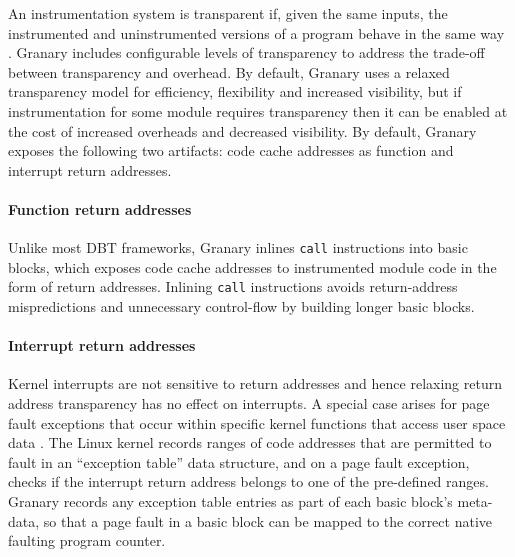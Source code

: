 \documentclass[preprint]{sigplanconf}
\begin{document}
An instrumentation system is transparent if, given the same inputs, the instrumented and uninstrumented versions of a program behave in the same way \cite{Transparency}. Granary includes configurable levels of transparency to address the trade-off between transparency and overhead. By default, Granary uses a relaxed transparency model for efficiency, flexibility and increased visibility, but if instrumentation for some module requires transparency then it can be enabled at the cost of increased overheads and decreased visibility. By default, Granary exposes the following two artifacts: code cache addresses as function and interrupt return addresses.

\paragraph{Function return addresses}\label{para:return_address_transparency} Unlike most DBT frameworks, Granary inlines \texttt{call} instructions into basic blocks, which exposes code cache addresses to instrumented module code in the form of return addresses. Inlining \texttt{call} instructions avoids return-address mispredictions and unnecessary control-flow by building longer basic blocks. 

\paragraph{Interrupt return addresses} Kernel interrupts are not sensitive to return addresses and hence relaxing return address transparency has no effect on interrupts. A special case arises for page fault exceptions that occur within specific kernel functions that access user space data \cite{btkernel}. The Linux kernel records ranges of code addresses that are permitted to fault in an ``exception table'' data structure, and on a page fault exception, checks if the interrupt return address belongs to one of the pre-defined ranges. Granary records any exception table entries as part of each basic block's meta-data, so that a page fault in a basic block can be mapped to the correct native faulting program counter.

\end{document}
